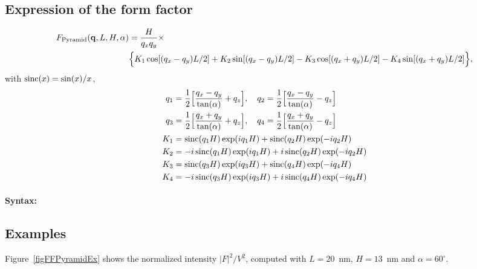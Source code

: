 \subsection{Expression of the form factor}
\begin{align}
F_{\rm{Pyramid}}(\mathbf{q},L, H, \alpha) &=
\frac{H}{q_x q_y} \times \nonumber \\ &\Big\{ K_1 \cos[
  (q_x-q_y)L/2 ] + K_2 \sin[ (q_x-q_y)L/2 ]
- K_3 \cos[ (q_x+q_y) L/2 ] - K_4 \sin[ (q_x+q_y) L/2 ]\Big\},
\label{eq:ffpyramid}
\end{align}
with $\operatorname{sinc}(x)=\sin(x)/x$,
\begin{align*}
       q_1 &=\frac{1}{2}\Big[\frac{q_x-q_y}{\tan(\alpha)} + q_z\Big],\quad       q_2 =\frac{1}{2}\Big[\frac{q_x-q_y}{\tan(\alpha)} - q_z\Big]\\
        q_3 &=\frac{1}{2}\Big[\frac{q_x+q_y}{\tan(\alpha)} + q_z\Big],\quad       q_4 =\frac{1}{2}\Big[\frac{q_x+q_y}{\tan(\alpha)} - q_z\Big]\\
        K_1 &= \operatorname{sinc}(q_1 H)\exp(i q_1 H)  + \operatorname{sinc}(q_2 H) \exp(-i q_2 H)\\
        K_2 &= -i \operatorname{sinc}(q_1 H) \exp(i q_1 H) +i \operatorname{sinc}(q_2 H) \exp(-i q_2 H)\\
        K_3 &= \operatorname{sinc}(q_3 H) \exp(i q_3 H)    + \operatorname{sinc}(q_4 H) \exp(-i q_4 H)\\
        K_4 &= -i \operatorname{sinc}(q_3 H) \exp(i q_3 H) + i \operatorname{sinc}(q_4 H) \exp(-i q_4 H) 
   \end{align*}

\paragraph{Syntax:}  

\subsection{Examples}
Figure~\ref{figFFPyramidEx} shows the normalized intensity
$|F|^2/V^2$, computed with $L=20$~nm, $H=13$~nm and
$\alpha=60^{\circ}$.


